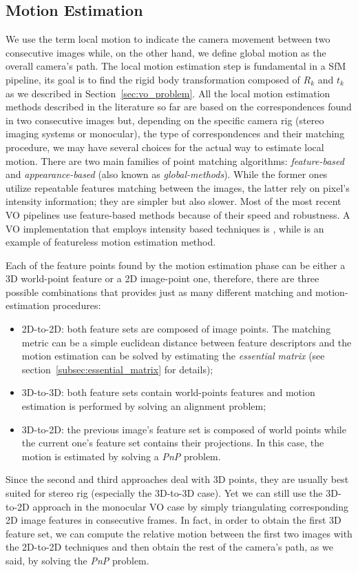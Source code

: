 \subsection{Motion Estimation}
\label{subsec:motion_estimation}
We use the term local motion to indicate the camera movement between two 
consecutive images while, on the other hand, we define global motion as
the overall camera's path.
The local motion estimation step is fundamental in a SfM pipeline, its goal is 
to find the rigid body transformation composed of $R_k$ and $t_k$ as we 
described in Section~\ref{sec:vo_problem}.
All the local motion estimation methods described in the literature so far are 
based on the correspondences found in two consecutive images but, depending on the
specific camera rig (stereo imaging systems or monocular), the type of 
correspondences and their matching procedure, we may have several choices for
the actual way to estimate local motion.
There are two main families of point matching algorithms: \textit{feature-based}
and \textit{appearance-based} (also known as \textit{global-methods}).
While the former ones utilize repeatable features 
matching between the images, the latter rely on pixel's intensity information; 
they are simpler but also slower. Most of the 
most recent VO pipelines use feature-based methods because of
their speed and robustness.
A VO implementation that employs intensity based techniques is 
\cite{nister2004visual}, while \cite{makadia2007correspondence} is an example 
of featureless motion estimation method.

Each of the feature points found by the motion estimation phase can be 
either a 3D world-point feature or a 2D image-point one,
therefore, there are three possible combinations that provides just as many 
different matching and motion-estimation procedures:
\begin{itemize}
	\item 2D-to-2D: both feature sets are composed of image points.
The matching metric can be a simple euclidean distance between feature 
descriptors and the motion estimation can be solved by estimating the 
\textit{essential matrix} (see section~\ref{subsec:essential_matrix} for 
details);
	\item 3D-to-3D: both feature sets contain world-points features and motion
estimation is performed by solving an alignment problem;
	\item 3D-to-2D: the previous image's feature set is composed of world points while
the current one's feature set contains their projections. In this case, the motion 
is estimated by solving a \textit{PnP} problem.
\end{itemize}
Since the second and third approaches deal with 3D points, they are usually 
best suited for stereo rig (especially the 3D-to-3D case).
Yet we can still use the 3D-to-2D approach in the monocular VO case by simply 
triangulating corresponding 2D image features in consecutive frames.
In fact, in order to obtain the first 3D feature set,
we can compute the relative motion between the first two images with 
the 2D-to-2D techniques and then obtain the rest of the camera's path,
as we said, by solving the \textit{PnP} problem.

